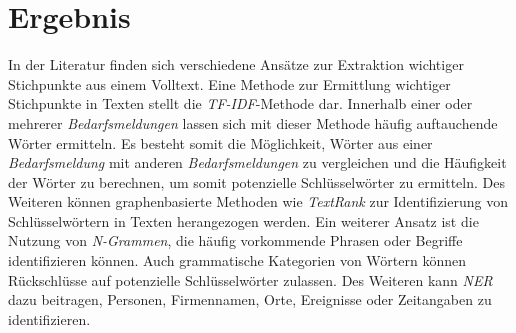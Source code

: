 \section{Ergebnis}
In der Literatur finden sich verschiedene Ansätze zur Extraktion wichtiger Stichpunkte aus einem Volltext. Eine Methode zur Ermittlung wichtiger Stichpunkte in Texten stellt die \emph{TF-IDF}-Methode dar. Innerhalb einer oder mehrerer \emph{Bedarfsmeldungen} lassen sich mit dieser Methode häufig auftauchende Wörter ermitteln. Es besteht somit die Möglichkeit, Wörter aus einer \emph{Bedarfsmeldung} mit anderen \emph{Bedarfsmeldungen} zu vergleichen und die Häufigkeit der Wörter zu berechnen, um somit potenzielle Schlüsselwörter zu ermitteln. Des Weiteren können graphenbasierte Methoden wie \emph{TextRank} zur Identifizierung von Schlüsselwörtern in Texten herangezogen werden. Ein weiterer Ansatz ist die Nutzung von \emph{N-Grammen}, die häufig vorkommende Phrasen oder Begriffe identifizieren können. Auch grammatische Kategorien von Wörtern können Rückschlüsse auf potenzielle Schlüsselwörter zulassen. %
Des Weiteren kann \emph{NER} dazu beitragen, Personen, Firmennamen, Orte, Ereignisse oder Zeitangaben zu identifizieren.




\newpage





